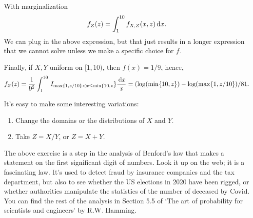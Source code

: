 \begin{exercise}
\begin{solution}
With marginalization
\begin{equation}
  \label{eq:21}
f_{Z}(z) =
\int_{1}^{10} f_{X,Z}(x,z) \,\textrm{d}x.
\end{equation}
We can plug in the above expression, but that just results in a longer expression that we cannot solve unless we make a specific choice for $f$.

Finally, if $X,Y$ uniform on $[1,10)$, then $f(x)=1/9$, hence,
\begin{align}
  \label{eq:21}
f_{Z}(z)
=\frac{1}{9^{2}}\int_{1}^{10}  \,I_{\max\{1, z/10\}< x \leq \min\{10, z}\} \frac{\,\textrm{d}x}{x}
=(\log(\min\{10, z\}) - \log(\max\{1, z/10\})/81.
\end{align}

It's easy to make some interesting variations:
\begin{enumerate}
\item Change the domains or the distributions of $X$ and $Y$.
\item Take $Z=X/Y$, or $Z=X+Y$.
\end{enumerate}

\end{solution}
\end{exercise}



\begin{remark}
  The above exercise is a step in the analysis of Benford's law that makes a statement on the first significant digit of numbers.
  Look it up on the web; it is a fascinating law.
  It's used to detect fraud by insurance companies and the tax department, but also to see whether the US elections in 2020 have been rigged, or whether authorities manipulate the statistics of the number of deceased by Covid.
  You can find the rest of the analysis in Section 5.5 of `The art of probability for scientists and engineers' by R.W.
  Hamming.
\end{remark}





